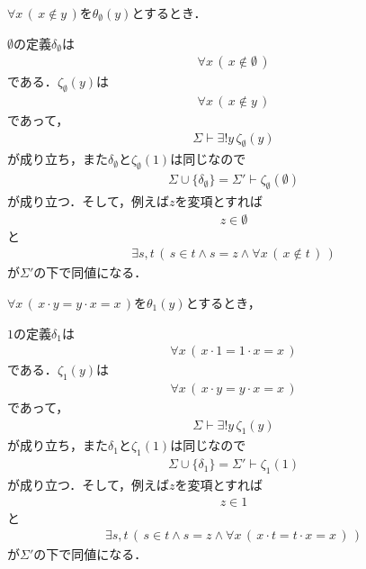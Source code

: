 	\begin{screen}
		$\forall x\, (\, x \notin y\, )$を$\theta_{\emptyset}(y)$とするとき．
	\end{screen}
	
	$\emptyset$の定義$\delta_{\emptyset}$は
	\begin{align}
		\forall x\, (\, x \notin \emptyset\, )
	\end{align}
	である．$\zeta_{\emptyset}(y)$は
	\begin{align}
		\forall x\, (\, x \notin y\, )
	\end{align}
	であって，
	\begin{align}
		\Sigma \vdash \exists! y\, \zeta_{\emptyset}(y)
	\end{align}
	が成り立ち，また$\delta_{\emptyset}$と$\zeta_{\emptyset}(1)$は同じなので
	\begin{align}
		\Sigma \cup \{\delta_{\emptyset}\} = \Sigma' \vdash \zeta_{\emptyset}(\emptyset)
	\end{align}
	が成り立つ．そして，例えば$z$を変項とすれば
	\begin{align}
		z \in \emptyset
	\end{align}
	と
	\begin{align}
		\exists s,t\, \left(\, s \in t \wedge s = z \wedge \forall x\, (\, x \notin t\, )\, \right)
	\end{align}
	が$\Sigma'$の下で同値になる．
	
	\begin{screen}
		$\forall x\, (\, x \cdot y = y \cdot x = x\, )$を$\theta_{1}(y)$とするとき，
	\end{screen}
	
	$1$の定義$\delta_{1}$は
	\begin{align}
		\forall x\, (\, x \cdot 1 = 1 \cdot x = x\, )
	\end{align}
	である．$\zeta_{1}(y)$は
	\begin{align}
		\forall x\, (\, x \cdot y = y \cdot x = x\, )
	\end{align}
	であって，
	\begin{align}
		\Sigma \vdash \exists! y\, \zeta_{1}(y)
	\end{align}
	が成り立ち，また$\delta_{1}$と$\zeta_{1}(1)$は同じなので
	\begin{align}
		\Sigma \cup \{\delta_{1}\} = \Sigma' \vdash \zeta_{1}(1)
	\end{align}
	が成り立つ．そして，例えば$z$を変項とすれば
	\begin{align}
		z \in 1
	\end{align}
	と
	\begin{align}
		\exists s,t\, \left(\, s \in t \wedge s = z \wedge \forall x\, (\, x \cdot t = t \cdot x = x\, )\, \right)
	\end{align}
	が$\Sigma'$の下で同値になる．
	

